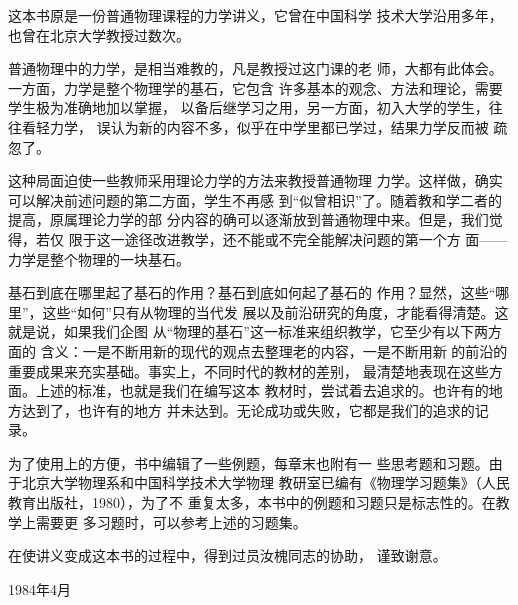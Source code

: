 \setcounter{page}{1}
\pagestyle{foreword}
\null\vspace{1em}
\begin{center}
  \label{foreword}

  \null{}
\end{center}
\fangsong\normalsize

这本书原是一份普通物理课程的力学讲义，它曾在中国科学
技术大学沿用多年，也曾在北京大学教授过数次。

普通物理中的力学，是相当难教的，凡是教授过这门课的老
师，大都有此体会。一方面，力学是整个物理学的基石，它包含
许多基本的观念、方法和理论，需要学生极为准确地加以掌握，
以备后继学习之用，另一方面，初入大学的学生，往往看轻力学，
误认为新的内容不多，似乎在中学里都已学过，结果力学反而被
疏忽了。

这种局面迫使一些教师采用理论力学的方法来教授普通物理
力学。这样做，确实可以解决前述问题的第二方面，学生不再感
到“似曾相识”了。随着教和学二者的提高，原属理论力学的部
分内容的确可以逐渐放到普通物理中来。但是，我们觉得，若仅
限于这一途径改进教学，还不能或不完全能解决问题的第一个方
面——力学是整个物理的一块基石。

基石到底在哪里起了基石的作用？基石到底如何起了基石的
作用？显然，这些“哪里”，这些“如何”只有从物理的当代发
展以及前沿研究的角度，才能看得清楚。这就是说，如果我们企图
从“物理的基石”这一标准来组织教学，它至少有以下两方面的
含义：一是不断用新的现代的观点去整理老的内容，一是不断用新
的前沿的重要成果来充实基础。事实上，不同时代的教材的差别，
最清楚地表现在这些方面。上述的标准，也就是我们在编写这本
教材时，尝试着去追求的。也许有的地方达到了，也许有的地方%
并未达到。无论成功或失败，它都是我们的追求的记录。

为了使用上的方便，书中编辑了一些例题，每章末也附有一
些思考题和习题。由于北京大学物理系和中国科学技术大学物理
教研室已编有《物理学习题集》（人民教育出版社，1980），为了不
重复太多，本书中的例题和习题只是标志性的。在教学上需要更
多习题时，可以参考上述的习题集。

在使讲义变成这本书的过程中，得到过员汝槐同志的协助，
谨致谢意。

\null{}

\hspace{6.8cm}

\mbox{}

\hspace{7cm}\normalfont{} 1984年4月\normalsize
\clearpage
